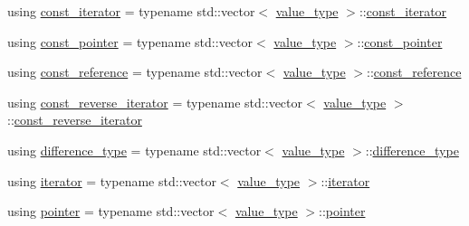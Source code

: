 \begin{DoxyCompactItemize}
\item 
using \hyperlink{class____gnu__cxx_1_1__Polynomial_a96e4523cc2a834724fe4224f0800486b}{const\+\_\+iterator} = typename std\+::vector$<$ \hyperlink{class____gnu__cxx_1_1__Polynomial_a725563351f50e76084a7a016c06f8a53}{value\+\_\+type} $>$\+::\hyperlink{class____gnu__cxx_1_1__Polynomial_a96e4523cc2a834724fe4224f0800486b}{const\+\_\+iterator}
\item 
using \hyperlink{class____gnu__cxx_1_1__Polynomial_aaf4c4bbd516b837df5fe70b3bda4e9af}{const\+\_\+pointer} = typename std\+::vector$<$ \hyperlink{class____gnu__cxx_1_1__Polynomial_a725563351f50e76084a7a016c06f8a53}{value\+\_\+type} $>$\+::\hyperlink{class____gnu__cxx_1_1__Polynomial_aaf4c4bbd516b837df5fe70b3bda4e9af}{const\+\_\+pointer}
\item 
using \hyperlink{class____gnu__cxx_1_1__Polynomial_a55e17774f3387e74adb57376d099cf16}{const\+\_\+reference} = typename std\+::vector$<$ \hyperlink{class____gnu__cxx_1_1__Polynomial_a725563351f50e76084a7a016c06f8a53}{value\+\_\+type} $>$\+::\hyperlink{class____gnu__cxx_1_1__Polynomial_a55e17774f3387e74adb57376d099cf16}{const\+\_\+reference}
\item 
using \hyperlink{class____gnu__cxx_1_1__Polynomial_a2a042a80127ab9a7b0349a54791e59af}{const\+\_\+reverse\+\_\+iterator} = typename std\+::vector$<$ \hyperlink{class____gnu__cxx_1_1__Polynomial_a725563351f50e76084a7a016c06f8a53}{value\+\_\+type} $>$\+::\hyperlink{class____gnu__cxx_1_1__Polynomial_a2a042a80127ab9a7b0349a54791e59af}{const\+\_\+reverse\+\_\+iterator}
\item 
using \hyperlink{class____gnu__cxx_1_1__Polynomial_a1b1f56c1951282267a0d18a420f53b80}{difference\+\_\+type} = typename std\+::vector$<$ \hyperlink{class____gnu__cxx_1_1__Polynomial_a725563351f50e76084a7a016c06f8a53}{value\+\_\+type} $>$\+::\hyperlink{class____gnu__cxx_1_1__Polynomial_a1b1f56c1951282267a0d18a420f53b80}{difference\+\_\+type}
\item 
using \hyperlink{class____gnu__cxx_1_1__Polynomial_a64bd557b6af46992e352dbe9e30fa201}{iterator} = typename std\+::vector$<$ \hyperlink{class____gnu__cxx_1_1__Polynomial_a725563351f50e76084a7a016c06f8a53}{value\+\_\+type} $>$\+::\hyperlink{class____gnu__cxx_1_1__Polynomial_a64bd557b6af46992e352dbe9e30fa201}{iterator}
\item 
using \hyperlink{class____gnu__cxx_1_1__Polynomial_a876dcb9c1b92c4896a3f3b9f26e7e3df}{pointer} = typename std\+::vector$<$ \hyperlink{class____gnu__cxx_1_1__Polynomial_a725563351f50e76084a7a016c06f8a53}{value\+\_\+type} $>$\+::\hyperlink{class____gnu__cxx_1_1__Polynomial_a876dcb9c1b92c4896a3f3b9f26e7e3df}{pointer}

\end{DoxyCompactItemize}
